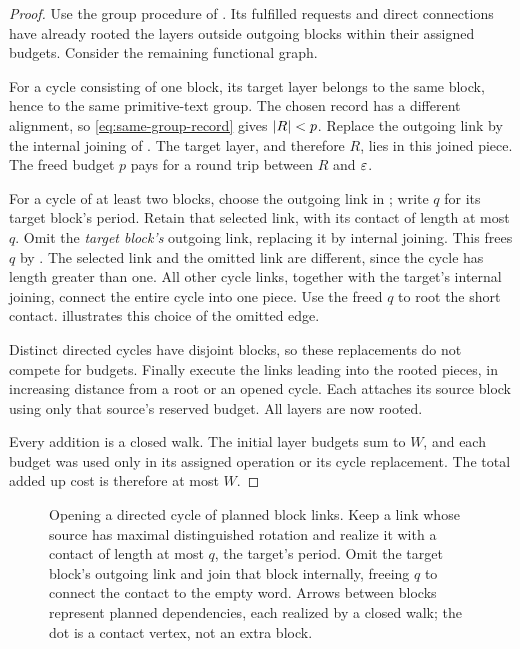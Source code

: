 \begin{proof}
Use the group procedure of . Its fulfilled requests and direct connections have already rooted the layers outside outgoing blocks within their assigned budgets. Consider the remaining functional graph.

For a cycle consisting of one block, its target layer belongs to the same block, hence to the same primitive-text group. The chosen record has a different alignment, so \eqref{eq:same-group-record} gives $\lvert R\rvert<p$. Replace the outgoing link by the internal joining of . The target layer, and therefore $R$, lies in this joined piece. The freed budget $p$ pays for a round trip between $R$ and $\varepsilon$.

For a cycle of at least two blocks, choose the outgoing link in ; write $q$ for its target block's period. Retain that selected link, with its contact of length at most $q$. Omit the \emph{target block's} outgoing link, replacing it by internal joining. This frees $q$ by . The selected link and the omitted link are different, since the cycle has length greater than one. All other cycle links, together with the target's internal joining, connect the entire cycle into one piece. Use the freed $q$ to root the short contact.  illustrates this choice of the omitted edge.

Distinct directed cycles have disjoint blocks, so these replacements do not compete for budgets. Finally execute the links leading into the rooted pieces, in increasing distance from a root or an opened cycle. Each attaches its source block using only that source's reserved budget. All layers are now rooted.

Every addition is a closed walk. The initial layer budgets sum to $W$, and each budget was used only in its assigned operation or its cycle replacement. The total added up cost is therefore at most $W$.
\end{proof}

\begin{figure}[t]
\centering

\caption{Opening a directed cycle of planned block links. Keep a link whose source has maximal distinguished rotation and realize it with a contact of length at most $q$, the target's period. Omit the target block's outgoing link and join that block internally, freeing $q$ to connect the contact to the empty word. Arrows between blocks represent planned dependencies, each realized by a closed walk; the dot is a contact vertex, not an extra block.}
\label{fig:cycles}
\end{figure}
